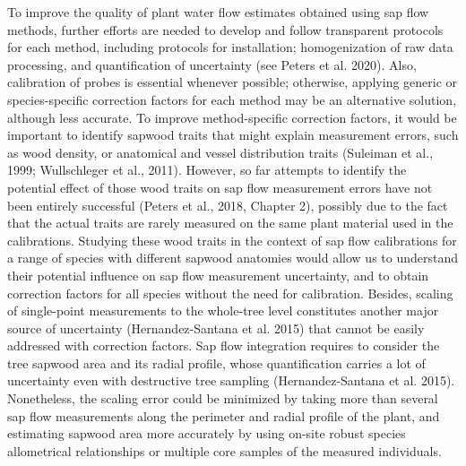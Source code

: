 \documentclass[11pt,twoside]{reedthesis}
\begin{document}
To improve the quality of plant water flow estimates obtained using sap
flow methods, further efforts are needed to develop and follow
transparent protocols for each method, including protocols for
installation; homogenization of raw data processing, and quantification
of uncertainty (see Peters et al. 2020). Also, calibration of probes is
essential whenever possible; otherwise, applying generic or
species-specific correction factors for each method may be an
alternative solution, although less accurate. To improve method-specific
correction factors, it would be important to identify sapwood traits
that might explain measurement errors, such as wood density, or
anatomical and vessel distribution traits (Suleiman et al., 1999;
Wullschleger et al., 2011). However, so far attempts to identify the
potential effect of those wood traits on sap flow measurement errors
have not been entirely successful (Peters et al., 2018, Chapter 2),
possibly due to the fact that the actual traits are rarely measured on
the same plant material used in the calibrations. Studying these wood
traits in the context of sap flow calibrations for a range of species
with different sapwood anatomies would allow us to understand their
potential influence on sap flow measurement uncertainty, and to obtain
correction factors for all species without the need for calibration.
Besides, scaling of single-point measurements to the whole-tree level
constitutes another major source of uncertainty (Hernandez-Santana et
al. 2015) that cannot be easily addressed with correction factors. Sap
flow integration requires to consider the tree sapwood area and its
radial profile, whose quantification carries a lot of uncertainty even
with destructive tree sampling (Hernandez-Santana et al. 2015).
Nonetheless, the scaling error could be minimized by taking more than
several sap flow measurements along the perimeter and radial profile of
the plant, and estimating sapwood area more accurately by using on-site
robust species allometrical relationships or multiple core samples of
the measured individuals.\par
\end{document}
